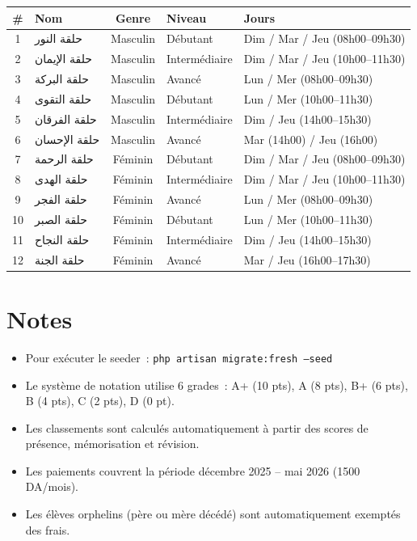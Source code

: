 \documentclass[a4paper,11pt]{article}
\begin{document}
\begin{longtable}{c l c l l}
    \toprule
    \textbf{\#} & \textbf{Nom}      & \textbf{Genre} & \textbf{Niveau} & \textbf{Jours} \\
    \midrule
    \endhead
    1  & حلقة النور     & Masculin & Débutant       & Dim / Mar / Jeu  (08h00--09h30) \\
    2  & حلقة الإيمان   & Masculin & Intermédiaire  & Dim / Mar / Jeu  (10h00--11h30) \\
    3  & حلقة البركة    & Masculin & Avancé         & Lun / Mer        (08h00--09h30) \\
    4  & حلقة التقوى    & Masculin & Débutant       & Lun / Mer        (10h00--11h30) \\
    5  & حلقة الفرقان   & Masculin & Intermédiaire  & Dim / Jeu        (14h00--15h30) \\
    6  & حلقة الإحسان   & Masculin & Avancé         & Mar (14h00) / Jeu (16h00) \\
    7  & حلقة الرحمة    & Féminin  & Débutant       & Dim / Mar / Jeu  (08h00--09h30) \\
    8  & حلقة الهدى     & Féminin  & Intermédiaire  & Dim / Mar / Jeu  (10h00--11h30) \\
    9  & حلقة الفجر     & Féminin  & Avancé         & Lun / Mer        (08h00--09h30) \\
    10 & حلقة الصبر     & Féminin  & Débutant       & Lun / Mer        (10h00--11h30) \\
    11 & حلقة النجاح    & Féminin  & Intermédiaire  & Dim / Jeu        (14h00--15h30) \\
    12 & حلقة الجنة     & Féminin  & Avancé         & Mar / Jeu        (16h00--17h30) \\
    \bottomrule
\end{longtable}

\vspace{0.5cm}

\section*{Notes}

\begin{itemize}
    \item Pour exécuter le seeder~: \texttt{php artisan migrate:fresh --seed}
    \item Le système de notation utilise 6 grades~: A+ (10 pts), A (8 pts), B+ (6 pts), B (4 pts), C (2 pts), D (0 pt).
    \item Les classements sont calculés automatiquement à partir des scores de présence, mémorisation et révision.
    \item Les paiements couvrent la période décembre 2025 -- mai 2026 (1500 DA/mois).
    \item Les élèves orphelins (père ou mère décédé) sont automatiquement exemptés des frais.
\end{itemize}
\end{document}
